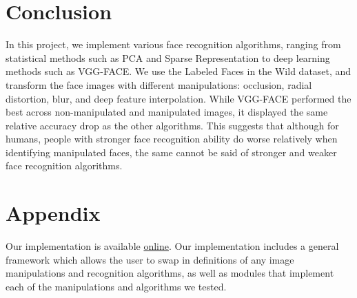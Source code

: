 \documentclass[pageno]{cos429}
\begin{document}
\section{Conclusion}
In this project, we implement various face recognition algorithms, ranging from statistical methods such as PCA and Sparse Representation to deep learning methods such as VGG-FACE. We use the Labeled Faces in the Wild dataset, and transform the face images with different manipulations: occlusion, radial distortion, blur, and deep feature interpolation. While VGG-FACE performed the best across non-manipulated and manipulated images, it displayed the same relative accuracy drop as the other algorithms. This suggests that although for humans, people with stronger face recognition ability do worse relatively when identifying manipulated faces, the same cannot be said of stronger and weaker face recognition algorithms.



 
\section{Appendix}\label{sec:Appendix}
Our implementation is available \href{https://github.com/cchen23/COS429_final_project}{online}. Our implementation includes a general framework which allows the user to swap in definitions of any image manipulations and recognition algorithms, as well as modules that implement each of the manipulations and algorithms we tested.

\end{document}
